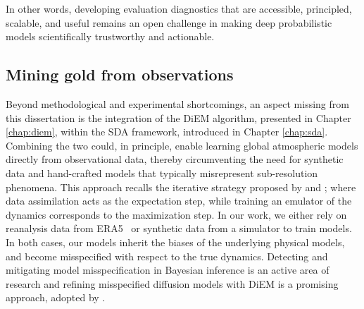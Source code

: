 In other words, developing evaluation diagnostics that are accessible, principled, scalable, and useful remains an open challenge in making deep probabilistic models scientifically trustworthy and actionable.

\vspace{-1ex}
\subsection*{Mining gold from observations}

Beyond methodological and experimental shortcomings, an aspect missing from this dissertation is the integration of the DiEM algorithm, presented in Chapter \ref{chap:diem}, within the SDA framework, introduced in Chapter \ref{chap:sda}. Combining the two could, in principle, enable learning global atmospheric models directly from observational data, thereby circumventing the need for synthetic data and hand-crafted models that typically misrepresent sub-resolution phenomena. This approach recalls the iterative strategy proposed by \textcite{bocquet2020bayesian}and \textcite{brajard2020combining, brajard2021combining}; where data assimilation acts as the expectation step, while training an emulator of the dynamics corresponds to the maximization step. In our work, we either rely on reanalysis data from ERA5~\cite{hersbach2020era5} or synthetic data from a simulator to train models. In both cases, our models inherit the biases of the underlying physical models, and become misspecified with respect to the true dynamics. Detecting and mitigating model misspecification in Bayesian inference is an active area of research \cite{cherief-abdellatif2020mmdbayes, wehenkel2022robust, dellaporta2022robust, cannon2022investigating, ward2022robust, huang2023learning, frazier2023reliable, gao2023generalized, nott2024bayesian, schmitt2024detecting, kelly2024misspecificationrobust, anaumontel2025tests, pierre2025mitigating, wehenkel2025addressing, senouf2025inductive, behrmann2025inferring} and refining misspecified diffusion models with DiEM is a promising approach, adopted by \textcite{barco2025tackling}.

